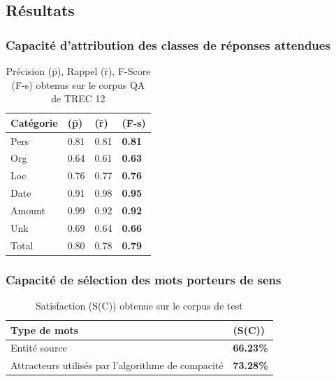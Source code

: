 \documentclass[xcolor=dvipsnames]{beamer}
\begin{document}
\subsection{Résultats}
\frame
{
    \frametitle{Capacité d'attribution des classes de réponses attendues}
    \begin{table}[h]
        \begin{center}
            \begin{tabular}{|p{2.5cm}|l|l|l|}
                \hline
                Catégorie & (\={p}) & (\={r}) & (\={F}-s) \\
                \hline
                Pers & 0.81 & 0.81 & \textbf{0.81} \\
                \hline
                Org & 0.64 & 0.61 & \textbf{0.63} \\
                \hline
                Loc & 0.76 & 0.77 & \textbf{0.76} \\
                \hline
                Date & 0.91 & 0.98 & \textbf{0.95} \\
                \hline
                Amount & 0.99 & 0.92 & \textbf{0.92} \\
                \hline
                Unk & 0.69 & 0.64 & \textbf{0.66} \\
                \hline
                \hline
                Total & 0.80 & 0.78 & \textbf{0.79} \\
                \hline
            \end{tabular}
            \caption{Précision (\={p}), Rappel (\={r}), F-Score (\={F}-s) obtenus sur le corpus QA de TREC 12}
        \end{center}
    \end{table}
}
\frame
{
    \frametitle{Capacité de sélection des mots porteurs de sens}
    \begin{table}[htbp]
        \begin{center}
            \begin{tabular}{|p{8cm}|l|}
                \hline
                Type de mots & (S(C)) \\
                \hline
                Entité source & \textbf{66.23\%} \\
                \hline
                Attracteurs utilisés par l'algorithme de compacité & \textbf{73.28\%} \\
                \hline
            \end{tabular}
            \caption{Satisfaction (S(C)) obtenue sur le corpus de test}
        \end{center}
    \end{table}
}
\end{document}

